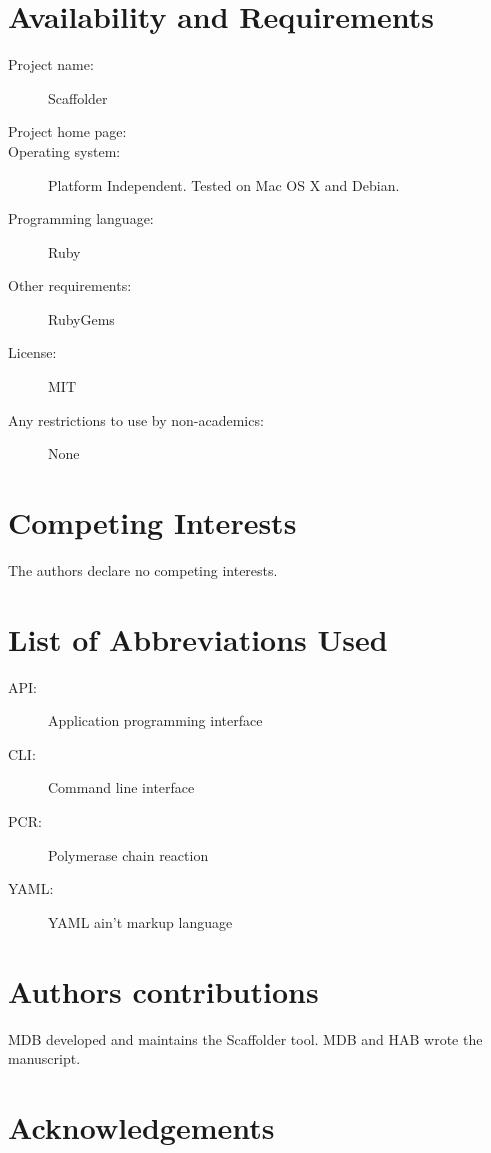 \documentclass[10pt]{bmc_article}
\newenvironment{bmcformat}{\begin{raggedright}\baselineskip20pt\sloppy\setboolean{publ}{false}}{\end{raggedright}\baselineskip20pt\sloppy}
\begin{document}
\begin{bmcformat}
\clearpage

\section*{Availability and Requirements} %

  \begin{description}
    \item[Project name:] Scaffolder
    \item[Project home page:] \scaffolder
    \item[Operating system:] Platform Independent. Tested on Mac OS X and
    Debian.
    \item[Programming language:] Ruby
    \item[Other requirements:] RubyGems
    \item[License:] MIT
    \item[Any restrictions to use by non-academics:] None
  \end{description}

\clearpage

\section*{Competing Interests} %

The authors declare no competing interests.

\section*{List of Abbreviations Used} %

  \begin{description}
    \item[API:] Application programming interface
    \item[CLI:] Command line interface
    \item[PCR:] Polymerase chain reaction
    \item[YAML:] YAML ain't markup language\cite{yaml}
  \end{description}

\section*{Authors contributions} %

MDB developed and maintains the Scaffolder tool. MDB and HAB wrote the
manuscript.

\section*{Acknowledgements} %


\end{bmcformat}
\end{document}
